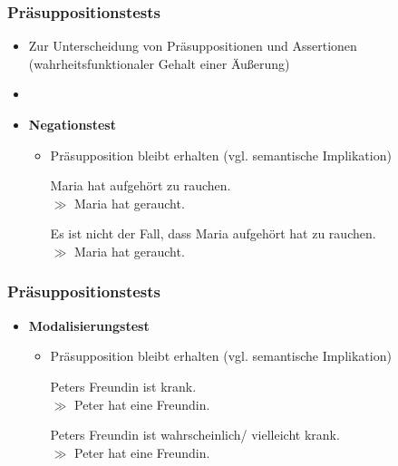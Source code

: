 
\begin{frame}
\frametitle{Präsuppositionstests}

\begin{itemize}
	\item Zur Unterscheidung von Präsuppositionen und Assertionen (wahrheitsfunktionaler Gehalt einer Äu\ss{}erung)
	\item[]
	\item \textbf{Negationstest}
	
	\begin{itemize}
		\item Präsupposition bleibt erhalten (vgl. semantische Implikation)		
		
		\ea Maria hat aufgehört zu rauchen.\\ $\gg$ Maria hat geraucht.
		\z
		
		\ea Es ist nicht der Fall, dass Maria aufgehört hat zu rauchen.\\ $\gg$ Maria hat geraucht.
		\z
		
	\end{itemize}	

\end{itemize}	



\end{frame}



\begin{frame}
\frametitle{Präsuppositionstests}

\begin{itemize}
	\item \textbf{Modalisierungstest}
	
	\begin{itemize}
		\item Präsupposition bleibt erhalten (vgl. semantische Implikation)

		\ea Peters Freundin ist krank.\\ $\gg$ Peter hat eine Freundin.
		\z
		
		\ea Peters Freundin ist wahrscheinlich/ vielleicht krank.\\ $\gg$ Peter hat eine Freundin.
		\z
	
	\end{itemize}
	
\end{itemize}

\end{frame}


